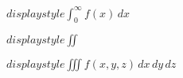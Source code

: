 \documentclass[10pt]{article}
\begin{document}
    \(displaystyle \int_0^\infty f(x) \, dx \)

    \(displaystyle \iint \)
    
    \(displaystyle \iiint f(x,y,z) \, dx \, dy \, dz \)
\end{document}
